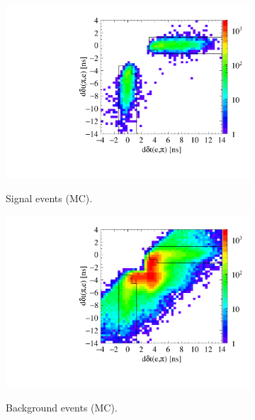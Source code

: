 \begin{figure}[h!]
  \centering
  \captionsetup[subfigure]{justification=centering}
  \begin{subfigure}{0.45\textwidth}
  {\includegraphics[width=1.0\textwidth]{Chapter7_analysis_kloe/img/tof2_signal}}
  \caption{Signal events (MC).}\label{fig:tof_12_t1_2}
\end{subfigure}
% 
  \hspace{1em}
\begin{subfigure}{0.45\textwidth}
  {\includegraphics[width=1.0\textwidth]{Chapter7_analysis_kloe/img/tof2_background}}
  \caption{Background events (MC).}\label{fig:tof_12_t1_3}
  \end{subfigure}
%
  \begin{subfigure}{0.45\textwidth}

\end{subfigure}
\end{figure}

